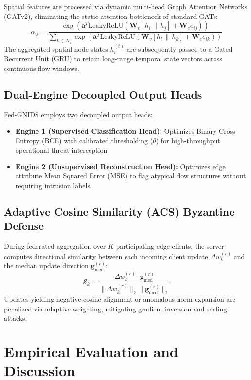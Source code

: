 \documentclass[conference]{IEEEtran}
\begin{document}
Spatial features are processed via dynamic multi-head Graph Attention Networks (GATv2), eliminating the static-attention bottleneck of standard GATs:
\begin{equation}
\alpha_{ij} = \frac{\exp\left(\mathbf{a}^T \text{LeakyReLU}\left(\mathbf{W}_v [h_i \,\|\, h_j] + \mathbf{W}_e e_{ij}\right)\right)}{\sum_{k \in \mathcal{N}_i} \exp\left(\mathbf{a}^T \text{LeakyReLU}\left(\mathbf{W}_v [h_i \,\|\, h_k] + \mathbf{W}_e e_{ik}\right)\right)}
\end{equation}
The aggregated spatial node states $h_i^{(t)}$ are subsequently passed to a Gated Recurrent Unit (GRU) to retain long-range temporal state vectors across continuous flow windows.

\subsection{Dual-Engine Decoupled Output Heads}
Fed-GNIDS employs two decoupled output heads:
\begin{itemize}
    \item \textbf{Engine 1 (Supervised Classification Head):} Optimizes Binary Cross-Entropy (BCE) with calibrated thresholding ($\theta$) for high-throughput operational threat interception.
    \item \textbf{Engine 2 (Unsupervised Reconstruction Head):} Optimizes edge attribute Mean Squared Error (MSE) to flag atypical flow structures without requiring intrusion labels.
\end{itemize}

\subsection{Adaptive Cosine Similarity (ACS) Byzantine Defense}
During federated aggregation over $K$ participating edge clients, the server computes directional similarity between each incoming client update $\Delta w_k^{(r)}$ and the median update direction $\mathbf{g}_{\text{med}}^{(r)}$:
\begin{equation}
\mathcal{S}_k = \frac{\Delta w_k^{(r)} \cdot \mathbf{g}_{\text{med}}^{(r)}}{\|\Delta w_k^{(r)}\|_2 \|\mathbf{g}_{\text{med}}^{(r)}\|_2}
\end{equation}
Updates yielding negative cosine alignment or anomalous norm expansion are penalized via adaptive weighting, mitigating gradient-inversion and scaling attacks.

\section{Empirical Evaluation and Discussion}
\end{document}
